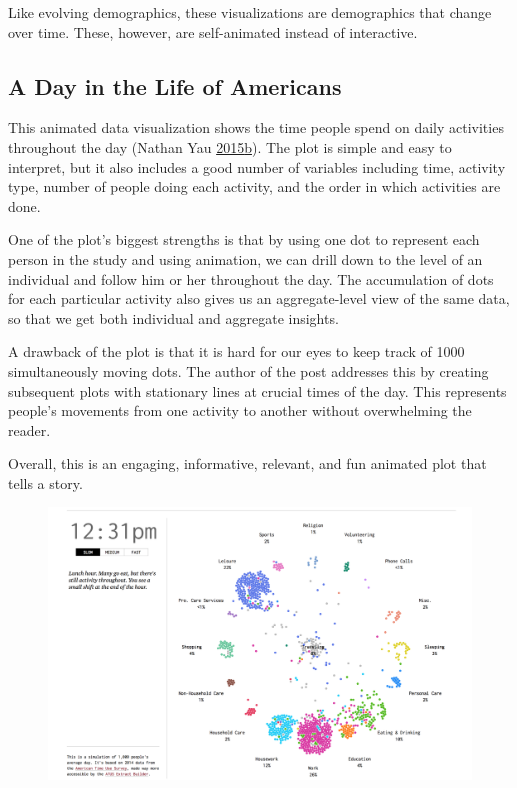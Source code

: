 \documentclass[]{book}
\begin{document}
Like evolving demographics, these visualizations are demographics that
change over time. These, however, are self-animated instead of
interactive.

\subsection{A Day in the Life of
Americans}\label{a-day-in-the-life-of-americans}

This animated data visualization shows the time people spend on daily
activities throughout the day (Nathan Yau
\protect\hyperlink{ref-American_life}{2015}\protect\hyperlink{ref-American_life}{b}).
The plot is simple and easy to interpret, but it also includes a good
number of variables including time, activity type, number of people
doing each activity, and the order in which activities are done.

One of the plot's biggest strengths is that by using one dot to
represent each person in the study and using animation, we can drill
down to the level of an individual and follow him or her throughout the
day. The accumulation of dots for each particular activity also gives us
an aggregate-level view of the same data, so that we get both individual
and aggregate insights.

A drawback of the plot is that it is hard for our eyes to keep track of
1000 simultaneously moving dots. The author of the post addresses this
by creating subsequent plots with stationary lines at crucial times of
the day. This represents people's movements from one activity to another
without overwhelming the reader.

Overall, this is an engaging, informative, relevant, and fun animated
plot that tells a story.

\begin{figure}
\centering
\includegraphics{images/life_of_americans.png}
\caption{}
\end{figure}
\end{document}
